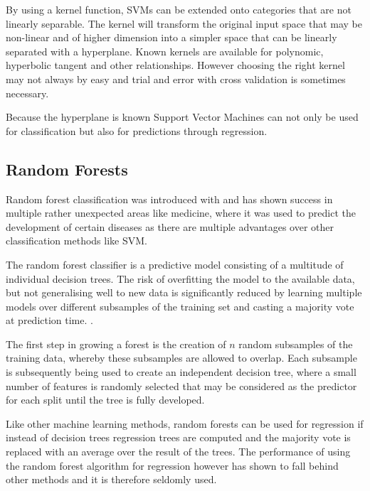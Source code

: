 By using a kernel function, SVMs can be extended onto categories that are not linearly separable. The kernel will transform the original input space that may be non-linear and of higher dimension into a simpler space that can be linearly separated with a hyperplane. Known kernels are available for polynomic, hyperbolic tangent and other relationships. However choosing the right kernel may not always by easy and trial and error with cross validation is sometimes necessary.

Because the hyperplane is known Support Vector Machines can not only be used for classification but also for predictions through regression.





\subsection{Random Forests}


Random forest classification was introduced with \cite{Breiman2001} and has shown success in multiple rather unexpected areas like medicine, where it was used to predict the development of certain diseases as there are multiple advantages over other classification methods like SVM.

The random forest classifier is a predictive model consisting of a multitude of individual decision trees. The risk of overfitting the model to the available data, but not generalising well to new data is significantly reduced by learning multiple models over different subsamples of the training set and casting a majority vote at prediction time. \cite{statisticallearning}.

The first step in growing a forest is the creation of $n$ random subsamples of the training data, whereby these subsamples are allowed to overlap. Each subsample is subsequently being used to create an independent decision tree, where a small number of features is randomly selected that may be considered as the predictor for each split until the tree is fully developed.

Like other machine learning methods, random forests can be used for regression if instead of decision trees regression trees are computed and the majority vote is replaced with an average over the result of the trees. The performance of using the random forest algorithm for regression however has shown to fall behind other methods and it is therefore seldomly used.

